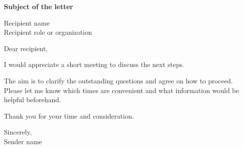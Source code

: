 \def\lakitlanguageprofile{english}
\def\lakitmainlanguage{english}
\def\lakitdocumentclass{article}
\def\lakitclassoptions{11pt,a4paper}
\def\lakitgeometryoptions{margin=2.2cm,headheight=14pt}
\def\lakitlinespread{1.18}
\def\lakitparagraphstyle{block}




{\LARGE\sffamily\bfseries\noindent Subject of the letter\par}\medskip
\noindent Recipient name\\
Recipient role or organization\par
Dear recipient,\par
I would appreciate a short meeting to discuss the next steps.

The aim is to clarify the outstanding questions and agree on how to proceed.
Please let me know which times are convenient and what information would be
helpful beforehand.

Thank you for your time and consideration.\par\medskip
Sincerely,\\
Sender name


